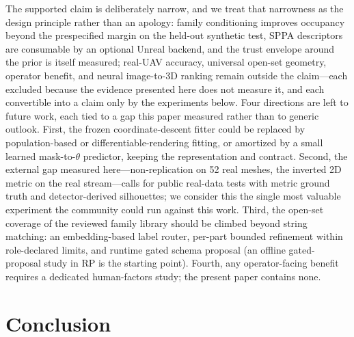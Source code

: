 \documentclass[11pt,a4paper]{article}
\begin{document}
The supported claim is deliberately narrow, and we treat that narrowness as
the design principle rather than an apology: family conditioning
improves occupancy beyond the prespecified margin on the held-out synthetic
test, SPPA descriptors are consumable by an optional Unreal backend, and the
trust envelope around the prior is itself measured;
real-UAV accuracy, universal open-set geometry, operator benefit, and neural
image-to-3D ranking remain outside the claim---each excluded because the
evidence presented here does not measure it, and each convertible into a
claim only by the experiments below.
Four directions are left to future work, each tied to a gap this paper
measured rather than to generic outlook. First, the frozen coordinate-descent
fitter could be replaced by population-based or differentiable-rendering
fitting, or amortized by a small learned
mask-to-\(\theta\) predictor, keeping the representation and contract. Second, the external gap measured
here---non-replication on 52 real meshes, the inverted 2D metric on the real
stream---calls for public real-data tests with metric ground truth and
detector-derived silhouettes; we consider this the single most valuable
experiment the community could run against this work. Third, the
open-set coverage of the reviewed family library should be climbed beyond
string matching:
an embedding-based label router, per-part bounded
refinement within role-declared limits, and runtime gated schema proposal
(an offline gated-proposal study in RP is the starting point). Fourth, any
operator-facing benefit requires a dedicated human-factors study; the present
paper contains none.

\section{Conclusion}
\end{document}
